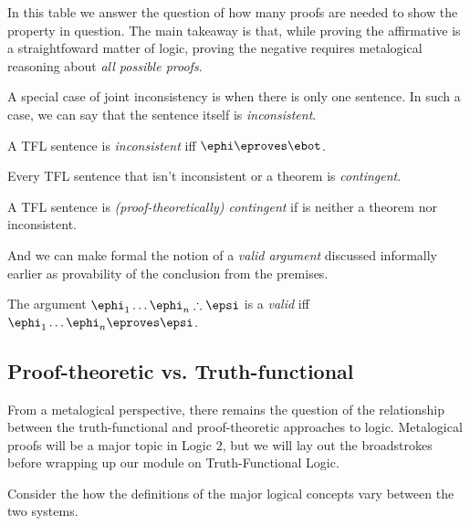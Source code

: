 In this table we answer the question of how many proofs are needed to show the
property in question. The main takeaway is that, while proving the affirmative
is a straightfoward matter of logic, proving the negative requires metalogical
reasoning about \emph{all possible proofs}.

A special case of joint inconsistency is when there is only one sentence. In
such a case, we can say that the sentence itself is \emph{inconsistent}.

\begin{definition}
  \label{def:tfl-inconsistent-sentence}
  A TFL sentence \ephi is \emph{inconsistent} iff $\ephi\eproves\ebot$.
\end{definition}

Every TFL sentence that isn't inconsistent or a theorem is \emph{contingent}.

\begin{definition}
  \label{def:tfl-contingent-sentence}
  A TFL sentence \ephi is \emph{(proof-theoretically) contingent} if \ephi is
  neither a theorem nor inconsistent.
\end{definition}

And we can make formal the notion of a \emph{valid argument} discussed
informally earlier as provability of the conclusion from the premises.

\begin{definition}
  \label{def:tfl-joint-consistency}
  The argument $\ephi_1\dots\ephi_n\therefore\epsi$ is a \emph{valid} iff
  $\ephi_1\dots\ephi_n\eproves\epsi$.
\end{definition}

\subsection{Proof-theoretic vs. Truth-functional}

From a metalogical perspective, there remains the question of the relationship
between the truth-functional and proof-theoretic approaches to logic.
Metalogical proofs will be a major topic in Logic 2, but we will lay out the
broadstrokes before wrapping up our module on Truth-Functional Logic.

Consider the how the definitions of the major logical concepts vary between
the two systems.

